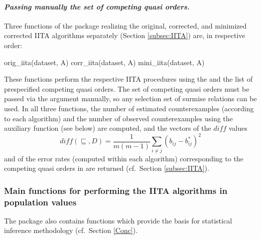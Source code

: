 \documentclass[nojss]{jss}
\begin{document}
\paragraph{\it Passing manually the set of competing quasi orders.}
Three functions of the package  realizing the original, corrected, and minimized 
corrected IITA algorithms separately (Section \ref{subsec:IITA}) are, in respective order:
\begin{Code}
orig_iita(dataset, A)
corr_iita(dataset, A)
mini_iita(dataset, A)
\end{Code}
These functions perform the respective IITA procedures using the  
and the list  of prespecified competing quasi orders.
The set of competing quasi orders must be passed via the argument  manually, so any selection set of surmise relations can be used. In all three functions, the number of estimated counterexamples (according to each algorithm) and the number of observed counterexamples 
using the auxiliary function  (see below) are computed, and the vectors of the $\mathit{diff}$ values 
\[
\mathit{diff} (\sqsubseteq, D) = \frac{1}{m(m-1)}\sum_{i \not= j} (b_{ij} - b^*_{ij})^2 
\]
and of the error rates (computed within each algorithm) corresponding to the competing 
quasi orders in  are returned (cf.\ Section \ref{subsec:IITA}).

\subsubsection{Main functions for performing the IITA algorithms in population values}

The package  also contains functions which provide the basis for statistical inference methodology (cf.\ Section \ref{Conc}). 
\end{document}
